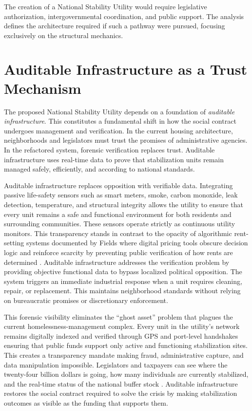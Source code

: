 \documentclass[12pt, letterpaper]{article}
\begin{document}
The creation of a National Stability Utility would require legislative authorization, intergovernmental coordination, and public support. The analysis defines the architecture required if such a pathway were pursued, focusing exclusively on the structural mechanics.

\section{Auditable Infrastructure as a Trust Mechanism}

The proposed National Stability Utility depends on a foundation of \emph{auditable infrastructure}. This constitutes a fundamental shift in how the social contract undergoes management and verification. In the current housing architecture, neighborhoods and legislators must trust the promises of administrative agencies. In the refactored system, forensic verification replaces trust. Auditable infrastructure uses real-time data to prove that stabilization units remain managed safely, efficiently, and according to national standards.

Auditable infrastructure replaces opposition with verifiable data. Integrating passive life-safety sensors such as smart meters, smoke, carbon monoxide, leak detection, temperature, and structural integrity allows the utility to ensure that every unit remains a safe and functional environment for both residents and surrounding communities. These sensors operate strictly as continuous utility monitors. This transparency stands in contrast to the opacity of algorithmic rent-setting systems documented by Fields where digital pricing tools obscure decision logic and reinforce scarcity by preventing public verification of how rents are determined \citep{fields_2022}. Auditable infrastructure addresses the verification problem by providing objective functional data to bypass localized political opposition. The system triggers an immediate industrial response when a unit requires cleaning, repair, or replacement. This maintains neighborhood standards without relying on bureaucratic promises or discretionary enforcement.

This forensic visibility eliminates the ``ghost asset'' problem that plagues the current homelessness-management complex. Every unit in the utility's network remains digitally indexed and verified through GPS and port-level handshakes ensuring that public funds support only active and functioning stabilization sites. This creates a transparency mandate making fraud, administrative capture, and data manipulation impossible. Legislators and taxpayers can see where the twenty-four billion dollars is going, how many individuals are currently stabilized, and the real-time status of the national buffer stock \citep{ca_state_auditor_2024}. Auditable infrastructure restores the social contract required to solve the crisis by making stabilization outcomes as visible as the funding that supports them.
\end{document}
